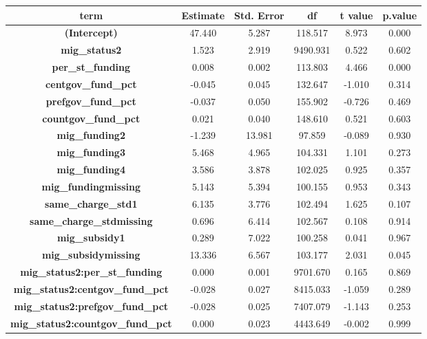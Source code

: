 \documentclass[
  man,
  floatsintext,
  longtable,
  nolmodern,
  notxfonts,
  notimes,
  colorlinks=true,linkcolor=blue,citecolor=blue,urlcolor=blue]{apa7}
\begin{document}
\begin{table}

{\caption{{The effect of education funding on average English exam
scores differences within
schools}{\label{tbl-english-achivement-comparison}}}
\vspace{-20pt}}

\begingroup\fontsize{10}{12}\selectfont

\begin{longtable*}[t]{>{}cccccc}
\toprule
term & Estimate & Std. Error & df & t value & p.value\\
\midrule
\textbf{(Intercept)} & 47.440 & 5.287 & 118.517 & 8.973 & 0.000\\
\textbf{mig\_status2} & 1.523 & 2.919 & 9490.931 & 0.522 & 0.602\\
\textbf{per\_st\_funding} & 0.008 & 0.002 & 113.803 & 4.466 & 0.000\\
\textbf{centgov\_fund\_pct} & -0.045 & 0.045 & 132.647 & -1.010 & 0.314\\
\textbf{prefgov\_fund\_pct} & -0.037 & 0.050 & 155.902 & -0.726 & 0.469\\
\addlinespace
\textbf{countgov\_fund\_pct} & 0.021 & 0.040 & 148.610 & 0.521 & 0.603\\
\textbf{mig\_funding2} & -1.239 & 13.981 & 97.859 & -0.089 & 0.930\\
\textbf{mig\_funding3} & 5.468 & 4.965 & 104.331 & 1.101 & 0.273\\
\textbf{mig\_funding4} & 3.586 & 3.878 & 102.025 & 0.925 & 0.357\\
\textbf{mig\_fundingmissing} & 5.143 & 5.394 & 100.155 & 0.953 & 0.343\\
\addlinespace
\textbf{same\_charge\_std1} & 6.135 & 3.776 & 102.494 & 1.625 & 0.107\\
\textbf{same\_charge\_stdmissing} & 0.696 & 6.414 & 102.567 & 0.108 & 0.914\\
\textbf{mig\_subsidy1} & 0.289 & 7.022 & 100.258 & 0.041 & 0.967\\
\textbf{mig\_subsidymissing} & 13.336 & 6.567 & 103.177 & 2.031 & 0.045\\
\textbf{mig\_status2:per\_st\_funding} & 0.000 & 0.001 & 9701.670 & 0.165 & 0.869\\
\addlinespace
\textbf{mig\_status2:centgov\_fund\_pct} & -0.028 & 0.027 & 8415.033 & -1.059 & 0.289\\
\textbf{mig\_status2:prefgov\_fund\_pct} & -0.028 & 0.025 & 7407.079 & -1.143 & 0.253\\
\textbf{mig\_status2:countgov\_fund\_pct} & 0.000 & 0.023 & 4443.649 & -0.002 & 0.999\\

\end{longtable*}
\end{table}
\end{document}
